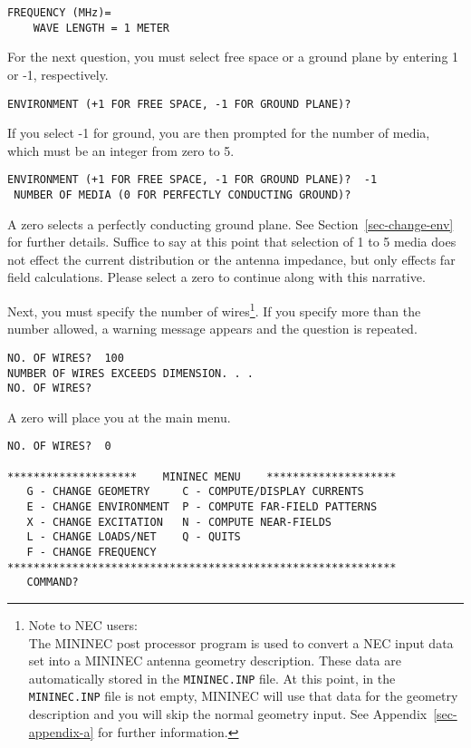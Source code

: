 \documentclass[12pt]{article}
\begin{document}
\begin{Verbatim}
FREQUENCY (MHz)=
    WAVE LENGTH = 1 METER
\end{Verbatim}

For the next question, you must select free space or a ground plane by
entering 1 or -1, respectively.

\begin{Verbatim}
ENVIRONMENT (+1 FOR FREE SPACE, -1 FOR GROUND PLANE)?
\end{Verbatim}

If you select -1 for ground, you are then prompted for the number of
media, which must be an integer from zero to 5.

\begin{Verbatim}
ENVIRONMENT (+1 FOR FREE SPACE, -1 FOR GROUND PLANE)?  -1
 NUMBER OF MEDIA (0 FOR PERFECTLY CONDUCTING GROUND)?
\end{Verbatim}

A zero selects a perfectly conducting ground plane. See
Section~\ref{sec-change-env} for further details. Suffice to say at this
point that selection of 1 to 5 media does not effect the current
distribution or the antenna impedance, but only effects far field
calculations. Please select a zero to continue along with this
narrative.

Next, you must specify the number of wires\footnote{Note to NEC users:\\
The MININEC post processor program is used to convert a NEC input data
set into a MININEC antenna geometry description. These data are
automatically stored in the \texttt{MININEC.INP} file. At this point, in
the \texttt{MININEC.INP} file is not empty, MININEC will use that data for
the geometry description and you will skip the normal geometry input.
See Appendix~\ref{sec-appendix-a} for further information.}. If you
specify more than the number allowed, a warning message appears and the
question is repeated.

\begin{Verbatim}
NO. OF WIRES?  100
NUMBER OF WIRES EXCEEDS DIMENSION. . .
NO. OF WIRES?
\end{Verbatim}

\noindent A zero will place you at the main menu.

\begin{Verbatim}
NO. OF WIRES?  0

********************    MININEC MENU    ********************
   G - CHANGE GEOMETRY     C - COMPUTE/DISPLAY CURRENTS
   E - CHANGE ENVIRONMENT  P - COMPUTE FAR-FIELD PATTERNS
   X - CHANGE EXCITATION   N - COMPUTE NEAR-FIELDS
   L - CHANGE LOADS/NET    Q - QUITS
   F - CHANGE FREQUENCY
************************************************************
   COMMAND?
\end{Verbatim}
\end{document}
